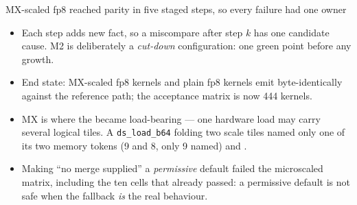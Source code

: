 
\begin{frame}{MX-scaled fp8 reached parity in five staged steps, so every failure had one owner}
\begin{center}
\end{center}

\begin{itemize}
\item Each step adds  new fact, so a miscompare after step $k$ has one candidate cause.
      M2 is deliberately a \emph{cut-down} configuration: one green point before any growth.
\item End state:  MX-scaled fp8 kernels and  plain fp8 kernels
      emit byte-identically against the reference path; the acceptance matrix is now 444 kernels.
\item MX is where the  became load-bearing --- one hardware load may carry
      several logical tiles. A \texttt{ds\_load\_b64} folding two scale tiles named only one of its
      two memory tokens (9 and 8, only 9 named) and .
\item Making ``no merge supplied'' a \emph{permissive} default failed the  microscaled
      matrix, including the ten cells that already passed: a permissive default is not safe when the
      fallback \emph{is} the real behaviour.
\end{itemize}
\end{frame}
